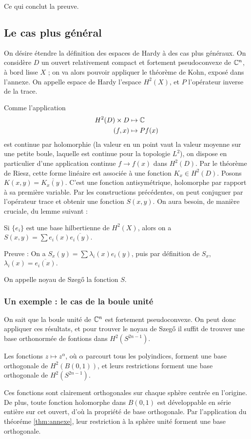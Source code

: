 Ce qui conclut la preuve.

\subsection{Le cas plus général}

On désire étendre la définition des espaces de Hardy à des cas plus généraux. On considère $D$ un ouvert relativement compact et fortement pseudoconvexe de $\mathbb{C}^n$, à bord lisse $X$ ; on va alors pouvoir appliquer le théorème de Kohn, exposé dans l'annexe. On appelle espace de Hardy l'espace $H^2(X)$, et $P$ l'opérateur inverse de la trace.

Comme l'application 
\begin{align*}
	H^2(D)\times D &\mapsto \mathbb{C}\\
	(f,x) &\mapsto Pf(x)
\end{align*} est continue par holomorphie (la valeur en un point vaut la valeur moyenne sur une petite boule, laquelle est continue pour la topologie $L^2$), on dispose en particulier d'une application continue $f \to f(x)$ dans $H^2(D)$. Par le théorème de Riesz, cette forme linéaire est associée à une fonction $K_x \in H^2(D)$. Posons $K(x,y) = \overline{K_x(y)}$. C'est une fonction antisymétrique, holomorphe par rapport à sa première variable. Par les constructions précédentes, on peut conjuguer par l'opérateur trace et obtenir une fonction $S(x,y)$. On aura besoin, de manière cruciale, du lemme suivant :

\begin{lem}
	Si $\{e_i\}$ est une base hilbertienne de $H^2(X)$, alors on a $S(x,y) = \sum e_i(x) \overline{e_i(y)}$.
\end{lem}

Preuve : On a $S_x(y) = \sum \lambda_i(x)e_i(y)$, puis par définition de $S_x$, $\lambda_i(x)= \overline{e_i(x)}$.

On appelle noyau de Szeg\H{o} la fonction $S$.

\subsubsection{Un exemple : le cas de la boule unité}
On sait que la boule unité de $\mathbb{C}^n$ est fortement pseudoconvexe. On peut donc appliquer ces résultats, et pour trouver le noyau de Szeg\H{o} il suffit de trouver une base orthonormée de fontions dans $H^2(S^{2n-1})$.

\begin{lem}
	Les fonctions $z \mapsto z^{\alpha}$, où $\alpha$ parcourt tous les polyindices, forment une base orthogonale de $H^2(B(0,1))$, et leurs restrictions forment une base orthogonale de $H^2(S^{2n-1})$.
\end{lem}
\begin{preuve}
	Ces fonctions sont clairement orthogonales sur chaque sphère centrée en l'origine. De plus, toute fonction holomorphe dans $B(0,1)$ est développable en série entière sur cet ouvert, d'où la propriété de base orthogonale. Par l'application du théoréme \ref{thm:annexe}, leur restriction à la sphère unité forment une base orthogonale.
\end{preuve}

